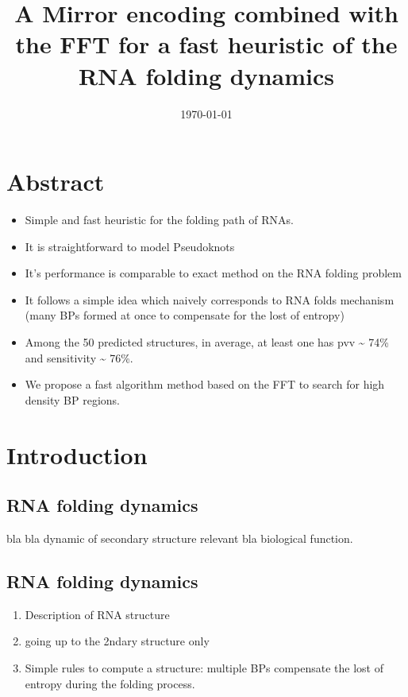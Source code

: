 \documentclass[a4paper,12pt]{article}
\date{\today}
\title{A Mirror encoding combined with the FFT for a fast heuristic of the RNA folding dynamics}
\begin{document}
\maketitle

\section{Abstract}
\label{sec:org9d90e07}
\begin{itemize}
\item Simple and fast heuristic for the folding path of RNAs.
\item It is straightforward to model Pseudoknots
\item It's performance is comparable to exact method on the RNA folding problem
\item It follows a simple idea which naively corresponds to RNA folds mechanism
(many BPs formed at once to compensate for the lost of entropy)
\item Among the 50 predicted structures, in average, at least one has pvv \textasciitilde{} 74\% and
sensitivity \textasciitilde{} 76\%.
\item We propose a fast algorithm method based on the FFT to search for high density
BP regions.
\end{itemize}

\clearpage
\section{Introduction}
\label{sec:orgb808b13}
\subsection{RNA folding dynamics}
\label{sec:orga1ee2ce}
bla bla dynamic of secondary structure relevant bla biological function.

\subsection{RNA folding dynamics}
\label{sec:orga0d38a2}
\begin{enumerate}
\item Description of RNA structure
\item going up to the 2ndary structure only
\item Simple rules to compute a structure: multiple BPs compensate the lost of
entropy during the folding process.
\end{enumerate}
\end{document}
